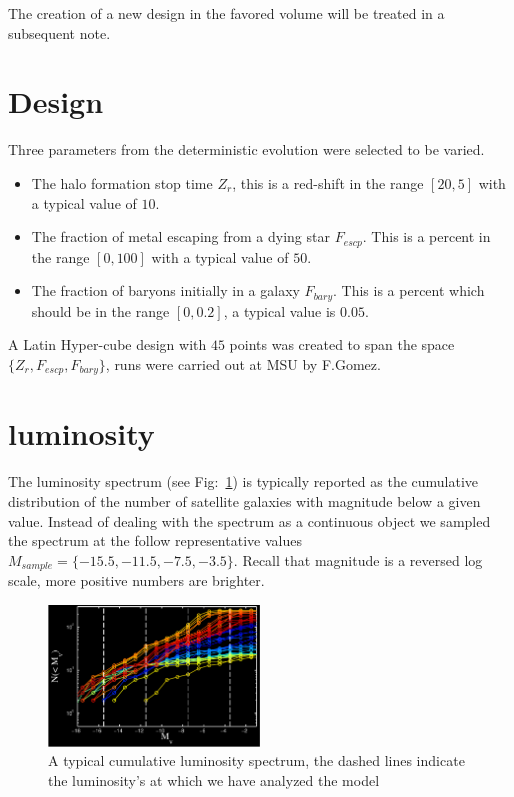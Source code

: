 \documentclass[11pt]{article}
\begin{document}
The creation of a new design in the favored volume will be treated in a subsequent note.

\section{Design}

Three parameters from the deterministic evolution were selected to be varied.
\begin{itemize}
\item The halo formation stop time $Z_r$, this is a red-shift in the range $[20, 5]$ with a typical value of $10$.
\item The fraction of metal escaping from a dying star $F_{escp}$. This is a percent in the range $[0,100]$ with a typical value of $50$.
\item The fraction of baryons initially in a galaxy $F_{bary}$. This is a percent which should be in the range $[0, 0.2]$, a typical value is $0.05$.
\end{itemize}

A Latin Hyper-cube design with $45$ points was created to span the space $\{Z_r, F_{escp}, F_{bary}\}$, runs were carried out at MSU by F.Gomez.

\section{luminosity}

The luminosity spectrum (see Fig:~\ref{fig-lum-typical}) is typically reported as the cumulative distribution of the number of satellite galaxies with magnitude below a given value. Instead of dealing with the spectrum as a continuous object we sampled the spectrum at the follow representative values $M_{sample} = \{ -15.5, -11.5, -7.5, -3.5\}$. Recall that magnitude is a reversed log scale, more positive numbers are brighter. 

\begin{figure}
  \begin{center}
    \includegraphics[width=0.5\textwidth]{./images/lf.pdf}
    \caption{A typical cumulative luminosity spectrum, the dashed lines indicate the luminosity's at which we have analyzed the model}
    \label{fig-lum-typical}
  \end{center}
\end{figure}
\end{document}
